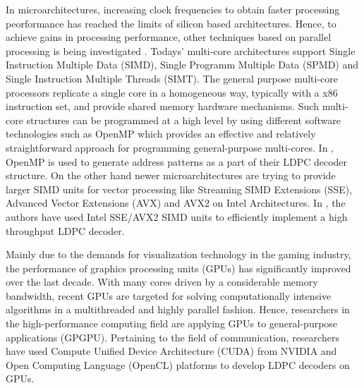 \documentclass[conference]{IEEEtran}
\begin{document}
In microarchitectures, increasing clock frequencies to obtain faster processing peorformance has reached the limits of silicon based architectures. Hence, to achieve gains in processing performance, other techniques based on parallel processing is being investigated \cite{art_ldpc_cpu1}. Todays' multi-core architectures support Single Instruction Multiple Data (SIMD), Single Programm Multiple Data (SPMD) and Single Instruction Multiple Threads (SIMT). The general purpose multi-core processors replicate a single core in a homogeneous way, typically with a x86 instruction set, and provide shared memory hardware mechanisms\cite{art_massively}. Such multi-core structures can be programmed at a high level by using different software technologies \cite{art_multicore_techs} such as OpenMP \cite{art_openMp_book} which provides an effective and relatively straightforward approach for programming general-purpose multi-cores. In \cite{art_cuda_openmp}, OpenMP is used to generate address patterns as a part of their LDPC decoder structure. On the other hand newer microarchitectures are trying to provide larger SIMD units for vector processing like Streaming SIMD Extensions (SSE), Advanced Vector Extensions (AVX) and AVX2 \cite{art_intel_sse} on Intel Architectures. In \cite{art_ldpc_cpu1}, the authors have used Intel SSE/AVX2 SIMD units to efficiently implement a high throughput LDPC decoder.

Mainly due to the demands for visualization technology in the gaming industry, the performance of graphics processing units (GPUs) has significantly improved over the last decade. With many cores driven by a considerable memory bandwidth, recent GPUs are targeted for solving computationally intensive algorithms in a multithreaded and highly parallel fashion. Hence, researchers in the high-performance computing field are applying GPUs to general-purpose applications (GPGPU). Pertaining to the field of communication, researchers have used Compute Unified Device Architecture (CUDA) from NVIDIA \cite{art_gpu_0,art_cuda_openmp, art_memory_coalesced, art_optimize_0, art_layered1} and Open Computing Language (OpenCL) \cite{art_ldpc_OpenCl} platforms to develop LDPC decoders on GPUs.
\end{document}
